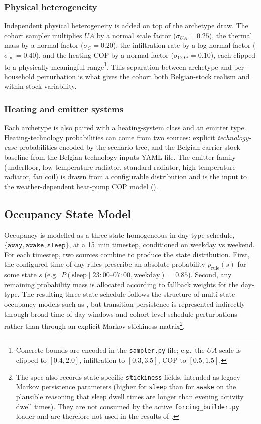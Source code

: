\subsubsection*{Physical heterogeneity}
Independent physical heterogeneity is added on top of the archetype draw. The cohort sampler multiplies $UA$ by a normal scale factor ($\sigma_{UA}=0.25$), the thermal mass by a normal factor ($\sigma_{C}=0.20$), the infiltration rate by a log-normal factor ($\sigma_{\text{inf}}=0.40$), and the heating COP by a normal factor ($\sigma_{\text{COP}}=0.10$), each clipped to a physically meaningful range\footnote{Concrete bounds are encoded in the \texttt{sampler.py} file; e.g.\ the $UA$ scale is clipped to $[0.4, 2.0]$, infiltration to $[0.3, 3.5]$, COP to $[0.5, 1.5]$.}. This separation between archetype and per-household perturbation is what gives the cohort both Belgian-stock realism and within-stock variability.

\subsubsection*{Heating and emitter systems}
Each archetype is also paired with a heating-system class and an emitter type. Heating-technology probabilities can come from two sources: explicit \emph{technology-case} probabilities encoded by the scenario tree, and the Belgian carrier stock baseline from the Belgian technology inputs YAML file. The emitter family (underfloor, low-temperature radiator, standard radiator, high-temperature radiator, fan coil) is drawn from a configurable distribution and is the input to the weather-dependent heat-pump COP model ().


\subsection{Occupancy State Model}
\label{sec:occupancyStateModel}

Occupancy is modelled as a three-state homogeneous-in-day-type schedule, $\{\texttt{away},\texttt{awake},\texttt{sleep}\}$, at a \SI{15}{min} timestep, conditioned on weekday vs weekend. For each timestep, two sources combine to produce the state distribution. First, the configured time-of-day rules prescribe an absolute probability $p_{\text{rule}}(s)$ for some state $s$ (e.g.\ $P(\text{sleep} \mid 23\!:\!00\text{--}07\!:\!00, \text{weekday}) = 0.85$). Second, any remaining probability mass is allocated according to fallback weights for the day-type. The resulting three-state schedule follows the structure of multi-state occupancy models such as \textcite{Richardson2010_DomesticHighRes}, but transition persistence is represented indirectly through broad time-of-day windows and cohort-level schedule perturbations rather than through an explicit Markov stickiness matrix\footnote{The spec also records state-specific \texttt{stickiness} fields, intended as legacy Markov persistence parameters (higher for \texttt{sleep} than for \texttt{awake} on the plausible reasoning that sleep dwell times are longer than evening activity dwell times). They are not consumed by the active \texttt{forcing\_builder.py} loader and are therefore not used in the results of .}.

